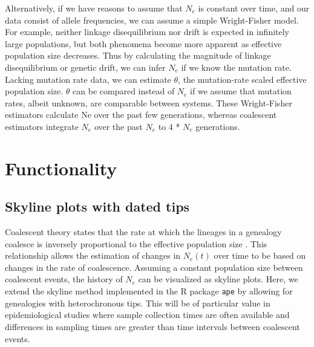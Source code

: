 \documentclass[english,titlepage]{article}
\begin{document}
Alternatively, if we have reasons to assume that $N_{e}$ is constant over time, and our data consist of allele frequencies, we can assume a simple Wright-Fisher model. For example, neither linkage disequilibrium nor drift is expected in infinitely large populations, but both phenomena become more apparent as effective population size decreases. Thus by calculating the magnitude of linkage disequilibrium or genetic drift, we can infer $N_{e}$ if we know the mutation rate. Lacking mutation rate data, we can estimate $\theta$,  the mutation-rate scaled effective population size. $\theta$ can be compared instead of $N_{e}$ if we assume that mutation rates, albeit unknown, are comparable between systems. These Wright-Fisher estimators calculate Ne over the past few generations, whereas coalescent estimators integrate $N_e$ over the past $N_e$ to 4 * $N_e$ generations.



\section*{Functionality}
\subsection*{Skyline plots with dated tips}

Coalescent theory states that the rate at which the lineages in a genealogy coalesce is inversely proportional to the effective population size \citep{Kingman1982} \citep{slatkin_pairwise_1991}. This relationship allows the estimation of changes in $N_e(t)$ over time to be based on changes in the rate of coalescence. Assuming a constant population size between coalescent events, the history of $N_e$ can be visualized as skyline plots. Here, we extend the skyline method implemented in the R package \texttt{ape} \citep{Paradis2004} by allowing for genealogies with heterochronous tips. This will be of particular value in epidemiological studies where sample collection times are often available and differences in sampling times are greater than time intervals between coalescent events. 
\end{document}
